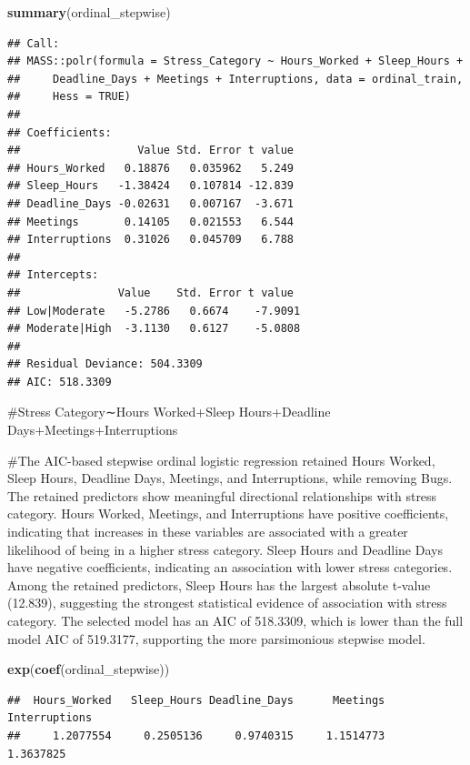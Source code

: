 \documentclass[
]{article}
\newenvironment{Shaded}{\begin{snugshade}}{\end{snugshade}}
\newcommand{\FunctionTok}[1]{\textcolor[rgb]{0.13,0.29,0.53}{\textbf{#1}}}
\newcommand{\NormalTok}[1]{#1}
\begin{document}
\begin{Shaded}
\begin{Highlighting}[]
\FunctionTok{summary}\NormalTok{(ordinal\_stepwise)}
\end{Highlighting}
\end{Shaded}

\begin{verbatim}
## Call:
## MASS::polr(formula = Stress_Category ~ Hours_Worked + Sleep_Hours + 
##     Deadline_Days + Meetings + Interruptions, data = ordinal_train, 
##     Hess = TRUE)
## 
## Coefficients:
##                  Value Std. Error t value
## Hours_Worked   0.18876   0.035962   5.249
## Sleep_Hours   -1.38424   0.107814 -12.839
## Deadline_Days -0.02631   0.007167  -3.671
## Meetings       0.14105   0.021553   6.544
## Interruptions  0.31026   0.045709   6.788
## 
## Intercepts:
##               Value    Std. Error t value 
## Low|Moderate   -5.2786   0.6674    -7.9091
## Moderate|High  -3.1130   0.6127    -5.0808
## 
## Residual Deviance: 504.3309 
## AIC: 518.3309
\end{verbatim}

\#Stress Category∼Hours Worked+Sleep Hours+Deadline
Days+Meetings+Interruptions

\#The AIC-based stepwise ordinal logistic regression retained Hours
Worked, Sleep Hours, Deadline Days, Meetings, and Interruptions, while
removing Bugs. The retained predictors show meaningful directional
relationships with stress category. Hours Worked, Meetings, and
Interruptions have positive coefficients, indicating that increases in
these variables are associated with a greater likelihood of being in a
higher stress category. Sleep Hours and Deadline Days have negative
coefficients, indicating an association with lower stress categories.
Among the retained predictors, Sleep Hours has the largest absolute
t-value (12.839), suggesting the strongest statistical evidence of
association with stress category. The selected model has an AIC of
518.3309, which is lower than the full model AIC of 519.3177, supporting
the more parsimonious stepwise model.

\begin{Shaded}
\begin{Highlighting}[]
\FunctionTok{exp}\NormalTok{(}\FunctionTok{coef}\NormalTok{(ordinal\_stepwise))}
\end{Highlighting}
\end{Shaded}

\begin{verbatim}
##  Hours_Worked   Sleep_Hours Deadline_Days      Meetings Interruptions 
##     1.2077554     0.2505136     0.9740315     1.1514773     1.3637825
\end{verbatim}
\end{document}
